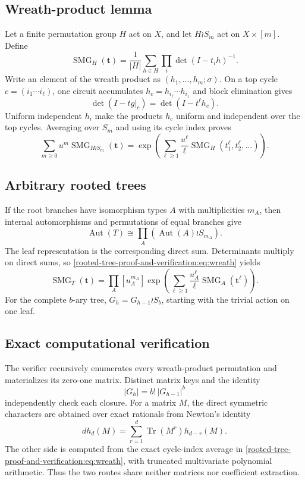 \documentclass[10pt]{article}
\newcommand{\SMG}{\operatorname{SMG}}
\newcommand{\MGF}{\SMG}
\begin{document}
\subsection{Wreath-product lemma}
Let a finite permutation group $H$ act on $X$, and let $H\wr S_m$ act on
$X\times[m]$.  Define
\[
\MGF_H(\mathbf t)=\frac1{|H|}\sum_{h\in H}
\prod_i\det(I-t_i h)^{-1}.
\]
Write an element of the wreath product as $(h_1,\ldots,h_m;\sigma)$.  On a
top cycle $c=(i_1\cdots i_\ell)$, one circuit accumulates
$h_c=h_{i_\ell}\cdots h_{i_1}$ and block elimination gives
\[
\det(I-tg|_c)=\det(I-t^\ell h_c).
\]
Uniform independent $h_i$ make the products $h_c$ uniform and independent
over the top cycles.  Averaging over $S_m$ and using its cycle index proves
\begin{equation}\label{rooted-tree-proof-and-verification:eq:wreath}
\boxed{\sum_{m\ge0}u^m\MGF_{H\wr S_m}(\mathbf t)=
\exp\left(\sum_{\ell\ge1}\frac{u^\ell}{\ell}
\MGF_H(t_1^\ell,t_2^\ell,\ldots)\right).}
\end{equation}

\subsection{Arbitrary rooted trees}
If the root branches have isomorphism types $A$ with multiplicities $m_A$,
then internal automorphisms and permutations of equal branches give
\[
\operatorname{Aut}(T)\cong\prod_A(\operatorname{Aut}(A)\wr S_{m_A}).
\]
The leaf representation is the corresponding direct sum.  Determinants
multiply on direct sums, so \eqref{rooted-tree-proof-and-verification:eq:wreath} yields
\begin{equation}\label{rooted-tree-proof-and-verification:eq:tree}
\boxed{\MGF_T(\mathbf t)=\prod_A[u_A^{m_A}]
\exp\left(\sum_{\ell\ge1}\frac{u_A^\ell}{\ell}
\MGF_A(\mathbf t^\ell)\right).}
\end{equation}
For the complete $b$-ary tree, $G_h=G_{h-1}\wr S_b$, starting with the
trivial action on one leaf.

\subsection{Exact computational verification}
The verifier recursively enumerates every wreath-product permutation and
materializes its zero-one matrix.  Distinct matrix keys and the identity
\[
|G_h|=b!\,|G_{h-1}|^b
\]
independently check each closure.  For a matrix $M$, the direct symmetric
characters are obtained over exact rationals from Newton's identity
\[
d h_d(M)=\sum_{r=1}^d\operatorname{Tr}(M^r)h_{d-r}(M).
\]
The other side is computed from the exact cycle-index average in
\eqref{rooted-tree-proof-and-verification:eq:wreath}, with truncated multivariate polynomial arithmetic.  Thus
the two routes share neither matrices nor coefficient extraction.
\end{document}
